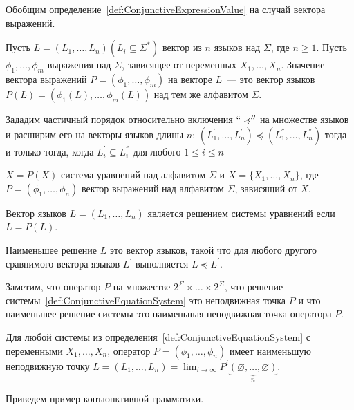 Обобщим определение~\ref{def:ConjunctiveExpressionValue} на случай вектора выражений.

\begin{definition}
    Пусть $L = (L_1,\ldots,L_n) (L_i \subseteq \Sigma^*)$ вектор из $n$ языков над $\Sigma$, где $n \geqslant 1$. Пусть $\phi_1,\ldots,\phi_m$ выражения над $\Sigma$, зависящее от переменных $X_1,\ldots,X_n$. Значение вектора выражений $P = (\phi_1,\ldots,\phi_m)$ на векторе $L$~--- это вектор языков $P(L) = (\phi_1(L),\ldots,\phi_m(L))$ над тем же алфавитом $\Sigma$.
\end{definition}

Зададим частичный порядок относительно включения $``\preccurlyeq''$ на множестве языков и расширим его на векторы языков длины $n$: $(L_1^{'},\ldots,L_n^{'})\preccurlyeq(L_1^{''},\ldots,L_n^{''})$ тогда и только тогда, когда $L_i^{'} \subseteq L_i^{''}$ для любого $1\leqslant i \leqslant n$

\begin{definition}\label{def:ConjunctiveEquationSystem}
   $X = P(X)$ система уравнений над алфавитом $\Sigma$ и $X = \{X_1,\ldots,X_n\}$, где $P = (\phi_1,\ldots,\phi_n)$ вектор выражений над алфавитом $\Sigma$, зависящий от $X$.

   Вектор языков $L = (L_1,\ldots,L_n)$ является решением системы уравнений если $L = P(L)$.

   Наименьшее решение $L$ это вектор языков, такой что для любого другого сравнимого вектора языков $L^{'}$ выполняется $L \preccurlyeq L^{'}$.
\end{definition}

Заметим, что оператор $P$ на множестве $2^{\Sigma}\times\ldots\times2^{\Sigma}$, что решение системы~\ref{def:ConjunctiveEquationSystem} это неподвижная точка $P$ и что наименьшее решение системы это наименьшая неподвижная точка оператора $P$.

\begin{theorem}\label{thm:LeastFixedPoint}
    Для любой системы из определения~\ref{def:ConjunctiveEquationSystem} с переменными $X_1,\ldots,X_n$, оператор $P = (\phi_1,\ldots,\phi_n)$ имеет наименьшую неподвижную точку $L = (L_1,\ldots,L_n) = \lim_{i\to\infty}P^{i}\underbrace{(\varnothing,\ldots,\varnothing)}_n$.
\end{theorem}

Приведем пример конъюнктивной грамматики.

